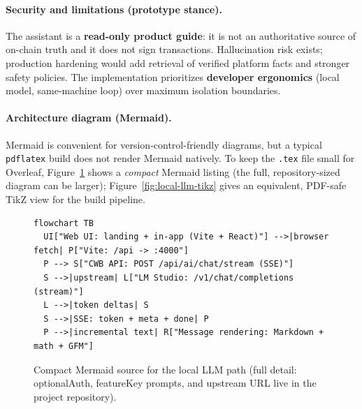 \documentclass[12pt,a4paper]{report}
\begin{document}
\paragraph{Security and limitations (prototype stance).}
The assistant is a \textbf{read-only product guide}: it is not an authoritative source of on-chain truth and it does not sign transactions. Hallucination risk exists; production hardening would add retrieval of verified platform facts and stronger safety policies. The implementation prioritizes \textbf{developer ergonomics} (local model, same-machine loop) over maximum isolation boundaries.

\paragraph{Architecture diagram (Mermaid).}
Mermaid is convenient for version-control-friendly diagrams, but a typical \texttt{pdflatex} build does not render Mermaid natively. To keep the \texttt{.tex} file small for Overleaf, Figure~\ref{fig:local-llm-mermaid} shows a \emph{compact} Mermaid listing (the full, repository-sized diagram can be larger); Figure~\ref{fig:local-llm-tikz} gives an equivalent, PDF-safe TikZ view for the build pipeline.

\begin{figure}[H]
\centering
\begin{tcolorbox}[colback=LightBlue,colframe=PrimaryBlue!35!white,boxrule=0.8pt,arc=3pt,left=4pt,right=4pt,top=4pt,bottom=4pt]
\small
\begin{verbatim}
flowchart TB
  UI["Web UI: landing + in-app (Vite + React)"] -->|browser fetch| P["Vite: /api -> :4000"]
  P --> S["CWB API: POST /api/ai/chat/stream (SSE)"]
  S -->|upstream| L["LM Studio: /v1/chat/completions (stream)"]
  L -->|token deltas| S
  S -->|SSE: token + meta + done| P
  P -->|incremental text| R["Message rendering: Markdown + math + GFM"]
\end{verbatim}
\end{tcolorbox}
\caption{Compact Mermaid source for the local LLM path (full detail: optionalAuth, featureKey prompts, and upstream URL live in the project repository).}
\label{fig:local-llm-mermaid}
\end{figure}
\end{document}
